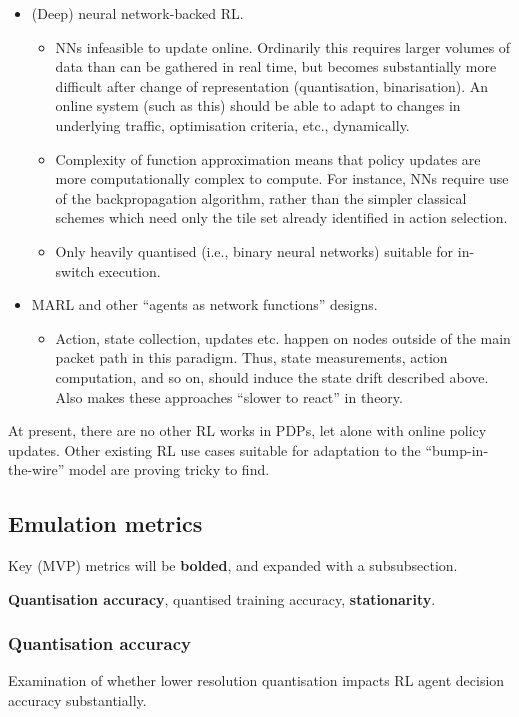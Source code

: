 \documentclass[sigconf,natbib=false]{acmart}
\begin{document}
\begin{itemize}
	\item (Deep) neural network-backed RL.
	\begin{itemize}
		\item NNs infeasible to update online. Ordinarily this requires larger volumes of data than can be gathered in real time, but becomes substantially more difficult after change of representation (quantisation, binarisation). An online system (such as this) should be able to adapt to changes in underlying traffic, optimisation criteria, etc., dynamically.
		\item Complexity of function approximation means that policy updates are more computationally complex to compute. For instance, NNs require use of the backpropagation algorithm, rather than the simpler classical schemes which need only the tile set already identified in action selection.
		\item Only heavily quantised (i.e., binary neural networks) suitable for in-switch execution.
	\end{itemize}

	\item MARL and other ``agents as network functions'' designs.
	\begin{itemize}
		\item Action, state collection, updates etc. happen on nodes outside of the main packet path in this paradigm. Thus, state measurements, action computation, and so on, should induce the state drift described above. Also makes these approaches ``slower to react'' in theory.
	\end{itemize}
\end{itemize}

At present, there are no other RL works in PDPs, let alone with online policy updates.
Other existing RL use cases suitable for adaptation to the ``bump-in-the-wire'' model are proving tricky to find.

\subsection{Emulation metrics}
Key (MVP) metrics will be \textbf{bolded}, and expanded with a subsubsection.

\textbf{Quantisation accuracy}, quantised training accuracy, \textbf{stationarity}.

\subsubsection{Quantisation accuracy}
Examination of whether lower resolution quantisation impacts RL agent decision accuracy substantially.
\end{document}
